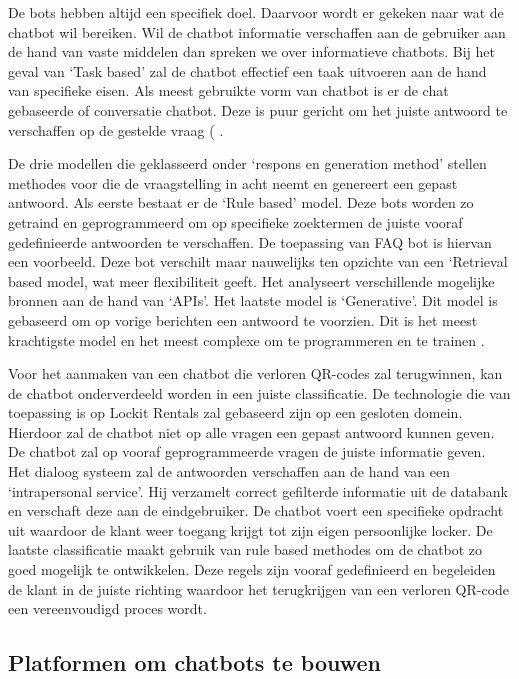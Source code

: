 De bots hebben altijd een specifiek doel. Daarvoor wordt er gekeken naar wat de chatbot wil bereiken. Wil de chatbot informatie verschaffen aan de gebruiker aan de hand van vaste middelen dan spreken we over informatieve chatbots. Bij het geval van ‘Task based’ zal de chatbot effectief een taak uitvoeren aan de hand van specifieke eisen. Als meest gebruikte vorm van chatbot is er de chat gebaseerde of conversatie chatbot. Deze is puur gericht om het juiste antwoord te verschaffen op de gestelde vraag (\autocite{Nimavat2017} \autocite{Adamopoulou2020}. 

De drie modellen die geklasseerd onder ‘respons en generation method’ stellen methodes voor die de vraagstelling in acht neemt en genereert een gepast antwoord. Als eerste bestaat er de ‘Rule based’ model. Deze bots worden zo getraind en geprogrammeerd om op specifieke zoektermen de juiste vooraf gedefinieerde antwoorden te verschaffen. De toepassing van \ac{FAQ} bot is hiervan een voorbeeld. Deze bot verschilt maar nauwelijks ten opzichte van een ‘Retrieval based model, wat meer flexibiliteit geeft. Het analyseert verschillende mogelijke bronnen aan de hand van ‘APIs’. Het laatste model is ‘Generative’.  Dit model is gebaseerd om op vorige berichten een antwoord te voorzien. Dit is het meest krachtigste model en het meest complexe om te programmeren en te trainen \autocite{Adamopoulou2020} \autocite{Hien2018}.

Voor het aanmaken van een chatbot die verloren QR-codes zal terugwinnen, kan de chatbot onderverdeeld worden in een juiste classificatie. De technologie die van toepassing is op Lockit Rentals zal gebaseerd zijn op een gesloten domein. Hierdoor zal de chatbot niet op alle vragen een gepast antwoord kunnen geven. De chatbot zal op vooraf geprogrammeerde vragen de juiste informatie geven. Het dialoog systeem zal de antwoorden verschaffen aan de hand van een ‘intrapersonal service’. Hij verzamelt correct gefilterde informatie uit de databank en verschaft deze aan de eindgebruiker. De chatbot voert een specifieke opdracht uit waardoor de klant weer toegang krijgt tot zijn eigen persoonlijke locker. De laatste classificatie maakt gebruik van rule based methodes om de chatbot zo goed mogelijk te ontwikkelen. Deze regels zijn vooraf gedefinieerd en begeleiden de klant in de juiste richting waardoor het terugkrijgen van een verloren QR-code een vereenvoudigd proces wordt.
\subsection{Platformen om chatbots te bouwen}%
\label{sec:chatbotBouwen}




